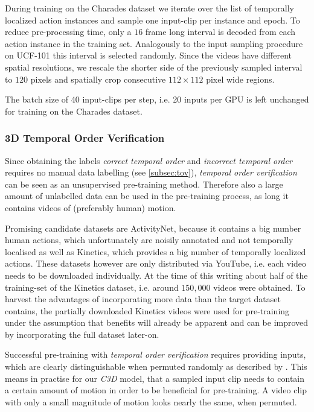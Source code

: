 During training on the Charades dataset we iterate over the list of temporally localized action instances and sample one input-clip per instance and epoch.
To reduce pre-processing time, only a $16$ frame long interval is decoded from each action instance in the training set.
Analogously to the input sampling procedure on UCF-101 this interval is selected randomly.
Since the videos have different spatial resolutions, we rescale the shorter side of the previously sampled interval to $120$ pixels and 
spatially crop consecutive $112 \times 112$ pixel wide regions.

The batch size of 40 input-clips per step, i.e. 20 inputs per GPU is left unchanged for training on the Charades dataset.

\subsubsection{3D Temporal Order Verification}
Since obtaining the labels \textit{correct temporal order} and \textit{incorrect temporal order} requires no manual data labelling (see \ref{subsec:tov}), \textit{temporal order verification} can be seen as an unsupervised pre-training method.
Therefore also a large amount of unlabelled data can be used in the pre-training process, as long it contains videos of (preferably human) motion.

Promising candidate datasets are ActivityNet, because it contains a big number human actions, which unfortunately are noisily annotated and not temporally localised as well as Kinetics, which provides a big number of temporally localized actions.
These datasets however are only distributed via YouTube, i.e. each video needs to be downloaded individually.
At the time of this writing about half of the training-set of the Kinetics dataset, i.e. around $150,000$ videos were obtained.
To harvest the advantages of incorporating more data than the target dataset contains, the partially downloaded Kinetics videos were used for pre-training under the assumption that benefits will already be apparent and can be improved by incorporating the full dataset later-on.

Successful pre-training with \textit{temporal order verification} requires providing inputs, which are clearly distinguishable when permuted randomly as described by \textcite{misra_shuffle_2016}.
This means in practise for our \textit{C3D} model, that a sampled input clip needs to contain a certain amount of motion in order to be beneficial for pre-training.
A video clip with only a small magnitude of motion looks nearly the same, when permuted.


